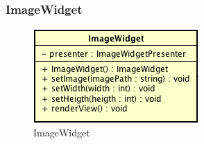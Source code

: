 \subsubsection{ImageWidget}

\label{ImageWidget}
\begin{figure}[ht]
	\centering
	\includegraphics[scale=0.5]{Sezioni/SottosezioniST/img/ImageWidget.png}
	\caption{ImageWidget}
\end{figure}

